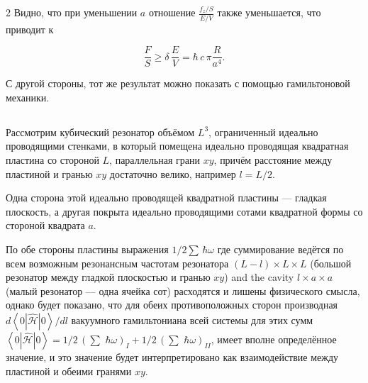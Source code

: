 \documentclass[twoside, 10pt]{article}
\def\myvspacebeforesubsection{-2.0mm}
\def\myvspaceaftersubsection{-2.5mm}
\begin{document}
\begin{multicols}{2}
Видно, что при уменьшении \(a\) отношение \(\frac{f_z/S}{E/V}\) также уменьшается, что приводит к

\begin{equation}\frac{F}{S} \geq \delta\,\frac{E}{V} = \hbar\,c\, \pi\frac{R}{a^4}.\end{equation}

С другой стороны, тот же результат можно показать с помощью гамильтоновой механики.


\vspace{\myvspacebeforesubsection}
    \subsection*{} \label{appendix-c.-hamiltonian-mechanics-approach}
\vspace{\myvspaceaftersubsection}


\setcounter{equation}{0}
\renewcommand{\theequation}{C.\arabic{equation}}

    Рассмотрим кубический резонатор объёмом \(L^3\), ограниченный идеально
проводящими стенками, в который помещена идеально проводящая квадратная пластина со стороной
\(L\), параллельная грани \(xy\), причём расстояние между пластиной и гранью \(xy\) достаточно велико, например \(l = L/2\).

Одна сторона этой идеально проводящей квадратной пластины — гладкая плоскость, а
другая покрыта идеально проводящими сотами квадратной формы со стороной квадрата \(a\).

По обе стороны пластины выражения \(1\big/2\sum\,\hbar\omega\)
где суммирование ведётся по всем возможным резонансным частотам резонатора \(\left(L-l\right)\times L\times L\) (большой резонатор между гладкой плоскостью и гранью \(xy\)) and the cavity \(l\times a\times a\) (малый резонатор — одна ячейка сот) расходятся и лишены физического смысла, однако будет показано, что для обеих противоположных сторон производная \({d\left<0|\hat{\mathcal{H}}|0\right>}\big/{dl}\) вакуумного гамильтониана всей системы для этих сумм
\(\left<0|\hat{\mathcal{H}}|0\right> = 1\big/2\,\left(\sum\,\,\hbar\omega\right)_{I} + 1\big/2\,\left(\sum\,\,\hbar\omega\right)_{II}\),
имеет вполне определённое значение, и это значение будет интерпретировано как взаимодействие между пластиной и обеими гранями \(xy\).


\end{multicols}
\end{document}
